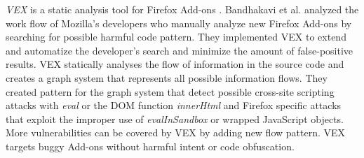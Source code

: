 	\textit{VEX} is a static analysis tool for Firefox Add-ons \cite{Bandhakavi:2011:VBE:1995376.1995398}. Bandhakavi et al. analyzed the work flow of Mozilla's developers who manually analyze new Firefox Add-ons by searching for possible harmful code pattern. They implemented VEX to extend and automatize the developer's search and minimize the amount of false-positive results. VEX statically analyses the flow of information in the source code and creates a graph system that represents all possible information flows. They created pattern for the graph system that detect possible cross-site scripting attacks with \textit{eval} or the DOM function \textit{innerHtml} and Firefox specific attacks that exploit the improper use of \textit{evalInSandbox} or wrapped JavaScript objects. More vulnerabilities can be covered by VEX by adding new flow pattern. VEX targets buggy Add-ons without harmful intent or code obfuscation. 
	
